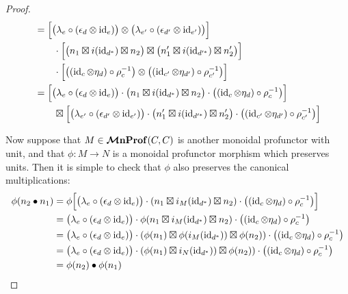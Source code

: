 \documentclass[11pt,oneside,article]{memoir}
\begin{document}
\begin{proof}
\begin{align*}
      &= \Bigl[\bigl(\lambda_e\circ(\epsilon_d\otimes\operatorname{id}_e)\bigr)\otimes\bigl(\lambda_{e'}\circ(\epsilon_{d'}\otimes\operatorname{id}_{e'})\bigr)\Bigr] \\
      &\qquad \cdot\Bigl[\bigl(n_1\boxtimes i(\operatorname{id}_{d^*})\boxtimes n_2\bigr)\boxtimes\bigl(n'_1\boxtimes i(\operatorname{id}_{d'^*})\boxtimes n'_2\bigr)\Bigr] \\
      &\qquad \cdot\Bigl[\bigl((\operatorname{id}_c\otimes\eta_d)\circ\rho_c^{-1}\bigr)\otimes\bigl((\operatorname{id}_{c'}\otimes\eta_{d'})\circ\rho_{c'}^{-1}\bigr)\Bigr] \\
      &= \Bigl[\bigl(\lambda_e\circ(\epsilon_d\otimes\operatorname{id}_e)\bigr)\cdot\bigl(n_1\boxtimes i(\operatorname{id}_{d^*})\boxtimes n_2\bigr)\cdot\bigl((\operatorname{id}_c\otimes\eta_d)\circ\rho_c^{-1}\bigr)\Bigr] \\
      &\qquad \boxtimes\Bigl[\bigl(\lambda_{e'}\circ(\epsilon_{d'}\otimes\operatorname{id}_{e'})\bigr)\cdot\bigl(n'_1\boxtimes i(\operatorname{id}_{d'^*})\boxtimes n'_2\bigr)\cdot\bigl((\operatorname{id}_{c'}\otimes\eta_{d'})\circ\rho_{c'}^{-1}\bigr)\Bigr]
   \end{align*}

   Now suppose that $M\in\bm{\mathcal{M}}\mathbf{nProf}(C, C)$ is another monoidal profunctor with unit, and that $\phi\colon M\to N$ is a monoidal profunctor morphism which preserves units.
   Then it is simple to check that $\phi$ also preserves the canonical multiplications:
   \begin{align*}
      \phi(n_2\bullet n_1) &= \phi\Bigl[\bigl(\lambda_e\circ(\epsilon_d\otimes\operatorname{id}_e)\bigr)\cdot(n_1\boxtimes i_M(\operatorname{id}_{d^*})\boxtimes n_2)\cdot\bigl((\operatorname{id}_c\otimes \eta_d)\circ\rho_c^{-1}\bigr)\Bigr] \\
      &= \bigl(\lambda_e\circ(\epsilon_d\otimes\operatorname{id}_e)\bigr)\cdot\phi(n_1\boxtimes i_M(\operatorname{id}_{d^*})\boxtimes n_2)\cdot\bigl((\operatorname{id}_c\otimes \eta_d)\circ\rho_c^{-1}\bigr) \\
      &= \bigl(\lambda_e\circ(\epsilon_d\otimes\operatorname{id}_e)\bigr)\cdot(\phi(n_1)\boxtimes \phi(i_M(\operatorname{id}_{d^*}))\boxtimes \phi(n_2))\cdot\bigl((\operatorname{id}_c\otimes \eta_d)\circ\rho_c^{-1}\bigr) \\
      &= \bigl(\lambda_e\circ(\epsilon_d\otimes\operatorname{id}_e)\bigr)\cdot(\phi(n_1)\boxtimes i_N(\operatorname{id}_{d^*}))\boxtimes \phi(n_2))\cdot\bigl((\operatorname{id}_c\otimes \eta_d)\circ\rho_c^{-1}\bigr) \\
      &= \phi(n_2)\bullet\phi(n_1)
   \end{align*}
\end{proof}
\end{document}
